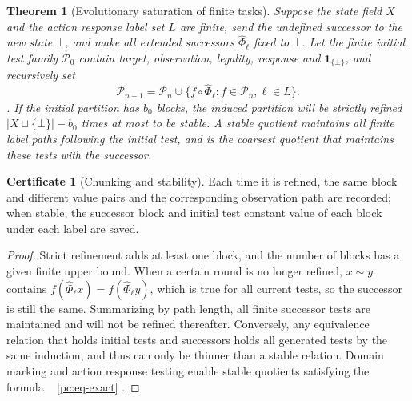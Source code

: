 \documentclass[11pt,a4paper]{article}
\theoremstyle{plain}
\newtheorem{theorem}{Theorem}[section]
\theoremstyle{definition}
\newtheorem*{certificate}{Certificate}
\theoremstyle{remark}
\begin{document}
\begin{CJK*}
\begin{theorem}
[Evolutionary saturation of finite tasks]\label{pc:saturation}
Suppose the state field $X$ and the action response label set $L$ are finite, send the undefined successor to the new state $\bot$, and make all extended successors $\widehat\Phi_\ell$ fixed to $\bot$. Let the finite initial test family $\mathcal P_0$ contain target, observation, legality, response and $\mathbf1_{\{\bot\}}$, and recursively set \[
 \mathcal P_{n+1}=\mathcal P_n\cup
 \{f\circ\widehat\Phi_\ell:f\in\mathcal P_n,\ell\in L\}.
\]. If the initial partition has $b_0$ blocks, the induced partition will be strictly refined $|X\sqcup\{\bot\}|-b_0$ times at most to be stable. A stable quotient maintains all finite label paths following the initial test, and is the coarsest quotient that maintains these tests with the successor.\end{theorem}
\begin{certificate}
[Chunking and stability]Each time it is refined, the same block and different value pairs and the corresponding observation path are recorded; when stable, the successor block and initial test constant value of each block under each label are saved.\end{certificate}
\begin{proof}
Strict refinement adds at least one block, and the number of blocks has a given finite upper bound. When a certain round is no longer refined, $x\sim y$ contains $f(\widehat\Phi_\ell x)=f(\widehat\Phi_\ell y)$, which is true for all current tests, so the successor is still the same. Summarizing by path length, all finite successor tests are maintained and will not be refined thereafter. Conversely, any equivalence relation that holds initial tests and successors holds all generated tests by the same induction, and thus can only be thinner than a stable relation. Domain marking and action response testing enable stable quotients satisfying the formula ~ \eqref{pc:eq-exact} .\end{proof}



\end{CJK*}
\end{document}
